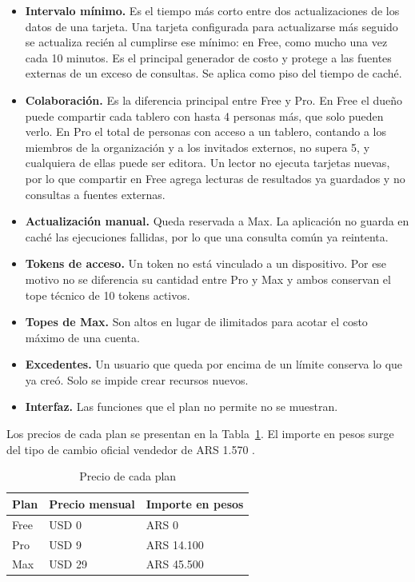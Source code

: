 \begin{itemize}
  \item \textbf{Intervalo mínimo.} Es el tiempo más corto entre dos actualizaciones de los datos de una tarjeta. Una tarjeta configurada para actualizarse más seguido se actualiza recién al cumplirse ese mínimo: en Free, como mucho una vez cada 10 minutos. Es el principal generador de costo y protege a las fuentes externas de un exceso de consultas. Se aplica como piso del tiempo de caché.
  \item \textbf{Colaboración.} Es la diferencia principal entre Free y Pro. En Free el dueño puede compartir cada tablero con hasta 4 personas más, que solo pueden verlo. En Pro el total de personas con acceso a un tablero, contando a los miembros de la organización y a los invitados externos, no supera 5, y cualquiera de ellas puede ser editora. Un lector no ejecuta tarjetas nuevas, por lo que compartir en Free agrega lecturas de resultados ya guardados y no consultas a fuentes externas.
  \item \textbf{Actualización manual.} Queda reservada a Max. La aplicación no guarda en caché las ejecuciones fallidas, por lo que una consulta común ya reintenta.
  \item \textbf{Tokens de acceso.} Un token no está vinculado a un dispositivo. Por ese motivo no se diferencia su cantidad entre Pro y Max y ambos conservan el tope técnico de 10 tokens activos.
  \item \textbf{Topes de Max.} Son altos en lugar de ilimitados para acotar el costo máximo de una cuenta.
  \item \textbf{Excedentes.} Un usuario que queda por encima de un límite conserva lo que ya creó. Solo se impide crear recursos nuevos.
  \item \textbf{Interfaz.} Las funciones que el plan no permite no se muestran.
\end{itemize}

Los precios de cada plan se presentan en la Tabla~\ref{tab:planes_precios}. El importe en pesos surge del tipo de cambio oficial vendedor de ARS 1.570 \cite{bna_cotizaciones}.

\begin{table}[H]
  \centering
  \renewcommand{\arraystretch}{1.2}
  \begin{tabular}{l l l}
    \toprule
    Plan & Precio mensual & Importe en pesos \\
    \midrule
    Free & USD 0 & ARS 0 \\
    Pro & USD 9 & ARS 14.100 \\
    Max & USD 29 & ARS 45.500 \\
    \bottomrule
  \end{tabular}
  \caption{Precio de cada plan}
  \label{tab:planes_precios}
\end{table}

